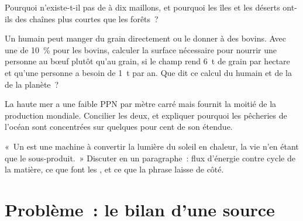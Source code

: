 \begin{exercise}[$\star\star$]\label{exo:b1:ecosystem-organization:9}
Pourquoi n'existe-t-il pas de  à dix maillons, et
pourquoi les îles et les déserts ont-ils des chaînes plus courtes que
les forêts~?
\end{exercise}

\begin{exercise}[$\star\star\star$]\label{exo:b1:ecosystem-organization:10}
Un humain peut manger du grain directement ou le donner à des bovins.
Avec une  de \qty{10}{\%} pour les bovins,
calculer la surface nécessaire pour nourrir une personne au bœuf plutôt
qu'au grain, si le champ rend \qty{6}{t} de grain par hectare et qu'une
personne a besoin de \qty{1}{t} par an. Que dit ce calcul du  humain et de la  de la planète~?
\end{exercise}

\begin{exercise}[$\star\star\star$]\label{exo:b1:ecosystem-organization:11}
La haute mer a une faible PPN par mètre carré mais fournit la moitié de
la production mondiale. Concilier les deux, et expliquer pourquoi les
pêcheries de l'océan sont concentrées sur quelques pour cent de son
étendue.
\end{exercise}

\begin{exercise}[$\star\star\star$]\label{exo:b1:ecosystem-organization:12}
«~Un  est une machine à convertir la lumière du soleil en
chaleur, la vie n'en étant que le sous-produit.~» Discuter en un
paragraphe~: flux d'énergie contre cycle de la matière, ce que font les
, et ce que la phrase laisse de côté.
\end{exercise}

\section{Problème~: le bilan d'une source}

